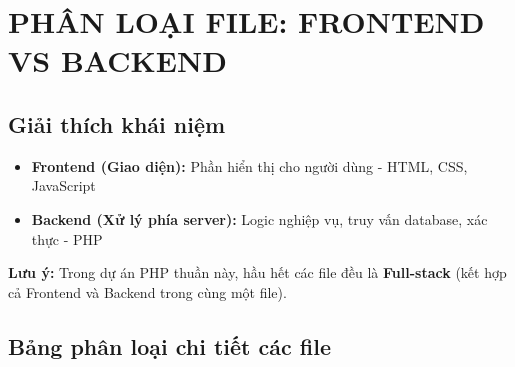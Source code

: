 \documentclass[a4paper,12pt]{article}
\begin{document}
\section{PHÂN LOẠI FILE: FRONTEND VS BACKEND}

\subsection{Giải thích khái niệm}

\begin{itemize}
    \item \textbf{Frontend (Giao diện):} Phần hiển thị cho người dùng - HTML, CSS, JavaScript
    \item \textbf{Backend (Xử lý phía server):} Logic nghiệp vụ, truy vấn database, xác thực - PHP
\end{itemize}

\textbf{Lưu ý:} Trong dự án PHP thuần này, hầu hết các file đều là \textbf{Full-stack} (kết hợp cả Frontend và Backend trong cùng một file).

\subsection{Bảng phân loại chi tiết các file}
\end{document}
